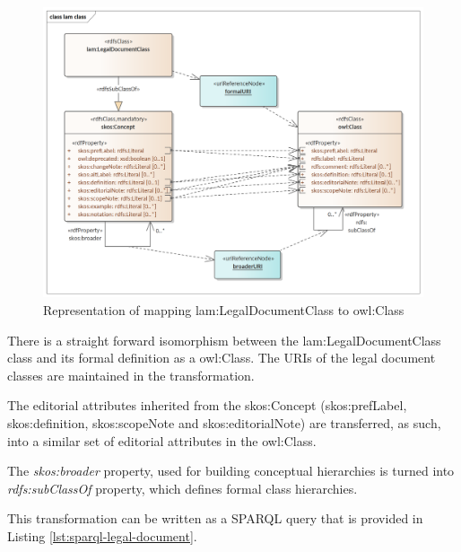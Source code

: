 	\begin{figure}[h]
		\centering
		\includegraphics[width=15cm]{images/lam-class.png}
		\caption{Representation of mapping lam:LegalDocumentClass to owl:Class}
		\label{fig:mapping-class}
	\end{figure}

	There is a straight forward isomorphism between the lam:LegalDocumentClass class and its formal definition as a owl:Class. The URIs of the legal document classes are maintained in the transformation. 
	
	The editorial attributes inherited from the skos:Concept (skos:prefLabel, skos:definition, skos:scopeNote and skos:editorialNote) are transferred, as such, into a similar set of editorial attributes in the owl:Class. 
	
	The \textit{skos:broader} property, used for building conceptual hierarchies is turned into \textit{rdfs:subClassOf} property, which defines formal class hierarchies.
	
	This transformation can be written as a SPARQL query that is provided in Listing \ref{lst:sparql-legal-document}. 

